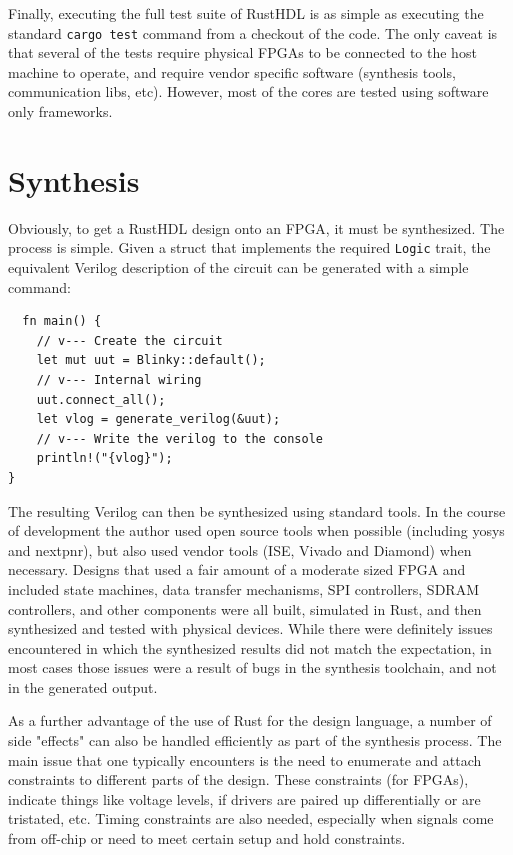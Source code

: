 \documentclass[conference]{IEEEtran}
\begin{document}
Finally, executing the full test suite of RustHDL is as simple as executing the standard \verb|cargo test| command from a 
checkout of the code.  The only caveat is that several of the tests require physical FPGAs to be connected to the host
machine to operate, and require vendor specific software (synthesis tools, communication libs, etc).  However, most 
of the cores are tested using software only frameworks.

\section{Synthesis}

Obviously, to get a RustHDL design onto an FPGA, it must be synthesized.  The process is simple.  Given a struct that
implements the required \verb|Logic| trait, the equivalent Verilog description of the circuit can be generated with a simple
command:

\begin{verbatim}
  fn main() {
    // v--- Create the circuit
    let mut uut = Blinky::default();
    // v--- Internal wiring
    uut.connect_all(); 
    let vlog = generate_verilog(&uut);
    // v--- Write the verilog to the console
    println!("{vlog}"); 
}
\end{verbatim}

The resulting Verilog can then be synthesized using standard tools.  In the course of development the author used 
open source tools when possible (including yosys and nextpnr), but also used vendor tools (ISE, Vivado and Diamond)
when necessary.  Designs that used a fair amount of a moderate sized FPGA and included state machines, data transfer 
mechanisms, SPI controllers, SDRAM controllers, and other components were all built, simulated in Rust, and then
synthesized and tested with physical devices.  While there were definitely issues encountered in which the synthesized 
results did not match the expectation, in most cases those issues were a result of bugs in the synthesis toolchain, and not
in the generated output.

As a further advantage of the use of Rust for the design language, a number of side "effects" can also be handled 
efficiently as part of the synthesis process.  The main issue that one typically encounters is the need to enumerate
and attach constraints to different parts of the design.  These constraints (for FPGAs), indicate things like 
voltage levels, if drivers are paired up differentially or are tristated, etc.  Timing constraints are also needed,
especially when signals come from off-chip or need to meet certain setup and hold constraints.  
\end{document}
